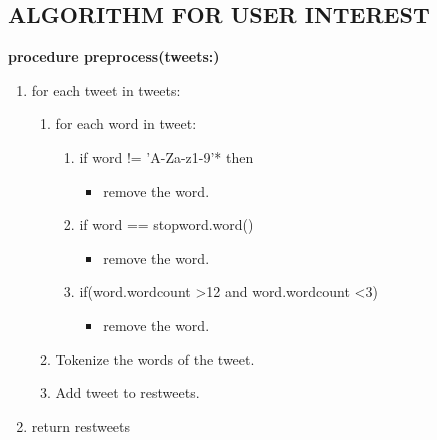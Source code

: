 \subsection{ALGORITHM FOR USER INTEREST}




\textbf{procedure preprocess(tweets:)}
\begin{enumerate}
    \item for each tweet in tweets:
    \begin{enumerate}
     \item for each word in tweet:
      \begin{enumerate}
          \item if word != 'A-Za-z1-9'* then
          \begin{itemize}
              \item remove the word.
          \end{itemize}
          \item if word == stopword.word()
          \begin{itemize}
              \item remove the word.
          \end{itemize}
          \item if(word.wordcount >12 and word.wordcount <3)
           \begin{itemize}
              \item remove the word.
          \end{itemize}
          
          
      \end{enumerate}
     \item Tokenize the words of the tweet.
     \item Add tweet to restweets.
    \end{enumerate}
    
    \item return restweets
\end{enumerate}
\paragraph{}
\paragraph{}
\paragraph{}

